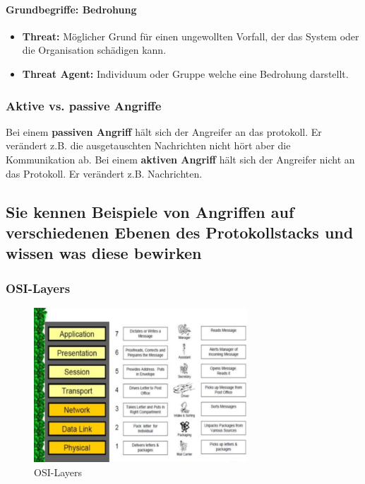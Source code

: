 \documentclass[10pt,a4paper]{article}
\begin{document}
\paragraph*{Grundbegriffe: Bedrohung}
\begin{itemize}[noitemsep,topsep=0pt,leftmargin=*]
    \item \textbf{Threat:} Möglicher Grund für einen ungewollten Vorfall, der das System oder die Organisation schädigen kann.
    \item \textbf{Threat Agent:} Individuum oder Gruppe welche eine Bedrohung darstellt.
\end{itemize}

\subsubsection*{Aktive vs. passive Angriffe}
Bei einem \textbf{passiven Angriff} hält sich der Angreifer an das protokoll. Er verändert z.B. die ausgetauschten Nachrichten nicht hört aber die Kommunikation ab.
Bei einem \textbf{aktiven Angriff} hält sich der Angreifer nicht an das Protokoll. Er verändert z.B. Nachrichten.

\subsection*{Sie kennen Beispiele von Angriffen auf verschiedenen Ebenen des Protokollstacks und wissen was diese bewirken}


\subsubsection*{OSI-Layers}
\begin{figure}[H]
    \begin{center}
    \includegraphics[width=8cm]{images/OSI-Layers.png}
    \caption{OSI-Layers}
    \label{OSI-Layers}
    \end{center}
\end{figure}
\end{document}
